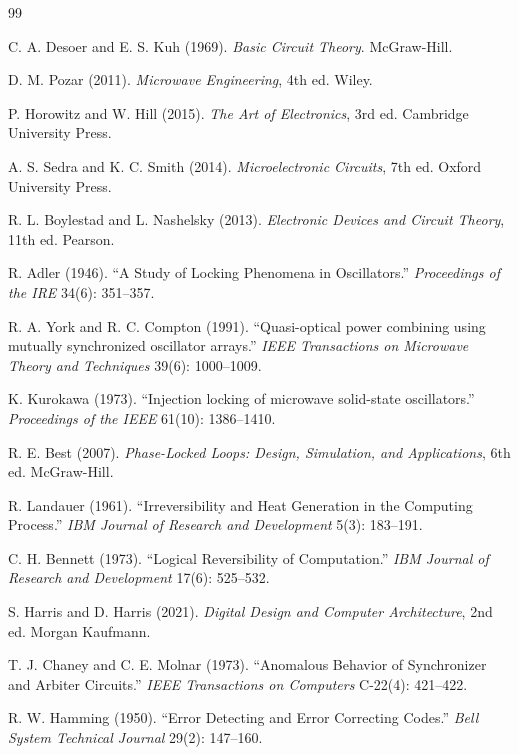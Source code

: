 \documentclass[12pt]{article}
\begin{document}
\begin{thebibliography}{99}

 C. A. Desoer and E. S. Kuh (1969). \emph{Basic Circuit Theory}. McGraw-Hill.

 D. M. Pozar (2011). \emph{Microwave Engineering}, 4th ed. Wiley.

 P. Horowitz and W. Hill (2015). \emph{The Art of Electronics}, 3rd ed. Cambridge University Press.

 A. S. Sedra and K. C. Smith (2014). \emph{Microelectronic Circuits}, 7th ed. Oxford University Press.

 R. L. Boylestad and L. Nashelsky (2013). \emph{Electronic Devices and Circuit Theory}, 11th ed. Pearson.

 R. Adler (1946). ``A Study of Locking Phenomena in Oscillators.'' \emph{Proceedings of the IRE} 34(6): 351--357.

 R. A. York and R. C. Compton (1991). ``Quasi-optical power combining using mutually synchronized oscillator arrays.'' \emph{IEEE Transactions on Microwave Theory and Techniques} 39(6): 1000--1009.

 K. Kurokawa (1973). ``Injection locking of microwave solid-state oscillators.'' \emph{Proceedings of the IEEE} 61(10): 1386--1410.

 R. E. Best (2007). \emph{Phase-Locked Loops: Design, Simulation, and Applications}, 6th ed. McGraw-Hill.

 R. Landauer (1961). ``Irreversibility and Heat Generation in the Computing Process.'' \emph{IBM Journal of Research and Development} 5(3): 183--191.

 C. H. Bennett (1973). ``Logical Reversibility of Computation.'' \emph{IBM Journal of Research and Development} 17(6): 525--532.

 S. Harris and D. Harris (2021). \emph{Digital Design and Computer Architecture}, 2nd ed. Morgan Kaufmann.

 T. J. Chaney and C. E. Molnar (1973). ``Anomalous Behavior of Synchronizer and Arbiter Circuits.'' \emph{IEEE Transactions on Computers} C-22(4): 421--422.

 R. W. Hamming (1950). ``Error Detecting and Error Correcting Codes.'' \emph{Bell System Technical Journal} 29(2): 147--160.


\end{thebibliography}
\end{document}
